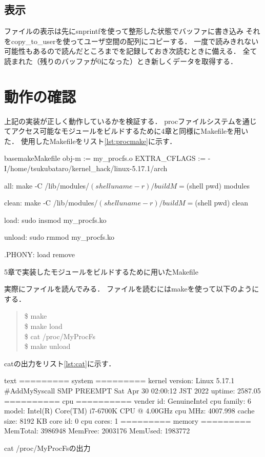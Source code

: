 \subsection{表示}
ファイルの表示は先にsnprintfを使って整形した状態でバッファに書き込み
それをcopy\_to\_userを使ってユーザ空間の配列にコピーする．
一度で読みきれない可能性もあるので読んだところまでを記録しておき次読むときに備える．
全て読まれた（残りのバッファが0になった）とき新しくデータを取得する．

\section{動作の確認}
上記の実装が正しく動作しているかを検証する．
procファイルシステムを通じてアクセス可能なモジュールをビルドするために4章と同様にMakefileを用いた．
使用したMakefileをリスト\ref{lst:procmake}に示す．
\begin{longlisting}
\begin{myminted}{basemake}{Makefile}
obj-m := my_procfs.o
EXTRA_CFLAGS := -I/home/tsukubataro/kernel_hack/linux-5.17.1/arch

all:
	make -C /lib/modules/$(shell uname -r)/build M=$(shell pwd) modules

clean:
	make -C /lib/modules/$(shell uname -r)/build M=$(shell pwd) clean

load:
	sudo insmod my_procfs.ko

unload:
	sudo rmmod my_procfs.ko

.PHONY: load remove
\end{myminted}
\caption{5章で実装したモジュールをビルドするために用いたMakefile}
\label{lst:procmake}
\end{longlisting}

実際にファイルを読んでみる．
ファイルを読むにはmakeを使って以下のようにする．
\begin{quote}
\$ make \\
\$ make load \\
\$ cat /proc/MyProcFs \\
\$ make unload
\end{quote}

catの出力をリスト\ref{lst:cat}に示す．
\begin{longlisting}
\begin{myminted}{text}{}
========= system =========
kernel version: Linux 5.17.1 #AddMySyscall SMP PREEMPT Sat Apr 30 02:00:12 JST 2022
uptime: 2587.05
========== cpu ==========
vender id: GenuineIntel
cpu family: 6
model: Intel(R) Core(TM) i7-6700K CPU @ 4.00GHz
cpu MHz: 4007.998
cache size: 8192 KB
core id: 0
cpu cores: 1
========= memory =========
MemTotal: 3986948
MemFree: 2003176
MemUsed: 1983772
\end{myminted}
\caption{cat /proc/MyProcFsの出力}
\label{lst:cat}
\end{longlisting}

